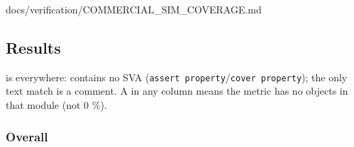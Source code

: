 \begin{relocated}{docs/verification/COMMERCIAL_SIM_COVERAGE.md}
\subsection{Results}\label{tm:flow:commercial-sim-coverage:2-results}

 is \code{--} everywhere:  contains no SVA
(\texttt{assert\ property}/\texttt{cover\ property}); the only text
match is a comment. A \code{--} in any column means the metric has no
objects in that module (not 0 \%).

\subsubsection{Overall}\label{tm:flow:commercial-sim-coverage:21-overall}

\begin{landscape}
\small\setlength{\tabcolsep}{4pt}


\end{landscape}
\end{relocated}
